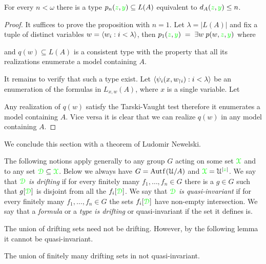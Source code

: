 \documentclass[creche.tex]{subfiles}
\begin{document}
\begin{proposition}\label{prop_Lascar_distance_type_def}
For every $n<\omega$ there is a type $p_n({\color{green} z},{\color{green} y})\subseteq L(A)$ equivalent to $d_A({\color{green} z},{\color{green} y})\le n$.  
\end{proposition}
\begin{proof}
It suffices to prove the proposition with $n=1$. Let $\lambda=|L(A)|$ and fix a tuple of distinct variables $w=\langle w_i:i<\lambda\rangle$, then $p_1({\color{green} z},{\color{green} y})\;=\;\exists w\;p(w,{\color{green} z},{\color{green} y})$ where


and $q(w)\subseteq L(A)$ is a consistent type with the property that all its realizations enumerate a model containing $A$.

It remains to verify that such a type exist. Let $\langle\psi_i(x,w_{\restriction i}):i<\lambda\rangle$ be an enumeration of the formulas in $L_{x,w}(A)$, where $x$ is a single variable. Let 


Any realization of $q(w)$ satisfy the Tarski-Vaught test therefore it enumerates a model containing $A$. Vice versa it is clear that we can realize $q(w)$ in any model containing $A$.
\end{proof}

We conclude this section with a theorem of Ludomir Newelski. 

The following notions apply generally to any group $G$ acting on some set ${\color{green}\EuScript X}$ and to any set ${\color{green}\EuScript D}\subseteq {\color{green}\EuScript X}$. Below we always have $G=\mathord{\rm Aut\kern.15ex{f}\kern.15ex}(\EuScript U/A)$ and ${\color{green}\EuScript X}=\EuScript U^{|{\color{green} z}|}$.  We say that ${\color{green}\EuScript D}$ \emph{is drifting\/} if for every finitely many $f_1,\dots,f_n\in G$ there is a $g\in G$ such that $g[{\color{green}\EuScript D}]$ is disjoint from all the $f_i[{\color{green}\EuScript D}]$. We say that ${\color{green}\EuScript D}$ \emph{is quasi-invariant\/} if for every finitely many $f_1,\dots,f_n\in G$ the sets  $f_i[{\color{green}\EuScript D}]$ have non-empty intersection. We say that a \emph{formula\/} or a \emph{type is drifting\/} or quasi-invariant if the set it defines is.

The union of drifting sets need not be drifting. However, by the following lemma it cannot be quasi-invariant.

\begin{lemma}\label{lem_newelski}
The union of finitely many drifting sets in not quasi-invariant.
\end{lemma}
\end{document}
